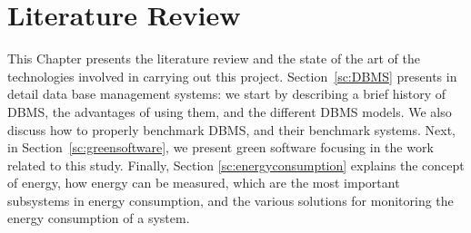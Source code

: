 \chapter{Literature Review}
\label{cha:StateofArt}

This Chapter presents the literature review and the state of the art of the technologies involved in carrying out this project.  Section~\ref{sc:DBMS} presents in detail data base management systems: we start by describing a brief history of DBMS, the advantages of using them, and the different DBMS models. We also discuss how to properly benchmark DBMS, and their benchmark systems. Next,  in Section~\ref{sc:greensoftware}, we present green software focusing in the  work related to this study. 
Finally, Section \ref{sc:energyconsumption} explains the concept of energy, how energy can be measured, which are the most important subsystems in energy consumption, and the various solutions for monitoring the energy consumption of a system.





